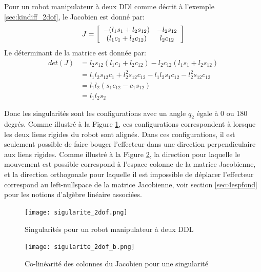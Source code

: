 \begin{example}

Pour un robot manipulateur à deux DDl comme décrit à l'exemple \ref{sec:kindiff_2dof}, le Jacobien est donné par:
\begin{align}
J = \left[ \begin{array}{c c} 
-(l_1 s_1 + l_2 s_{12}) & - l_2 s_{12} \\
 (l_1 c_1 + l_2 c_{12}) &   l_2 c_{12}
\end{array} \right]
\end{align} 
Le déterminant de la matrice est donnée par:
\begin{align}
det(J) &= l_2 s_{12} (l_1 c_1 + l_2 c_{12}) - l_2 c_{12} (l_1 s_1 + l_2 s_{12}) \\
       &= l_1 l_2 s_{12} c_1 + l_2^2 s_{12} c_{12} - l_1 l_2 s_1 c_{12} - l_2^2 s_{12} c_{12} \\
			 &= l_1 l_2 ( s_1 c_{12} - c_1 s_{12} ) \\
			 &= l_1 l_2 s_2
\end{align} 

Donc les singularités sont les configurations avec un angle $q_2$ égale à 0 ou 180 degrés. Comme illustré à la Figure \ref{fig:sigularite_2dof}, ces configurations correspondent à lorsque les deux liens rigides du robot sont alignés. Dans ces configurations, il est seulement possible de faire bouger l'effecteur dans une direction perpendiculaire aux liens rigides. Comme illustré à la Figure \ref{fig:sigularite_2dof_b}, la direction pour laquelle le mouvement est possible correspond à l'espace colonne de la matrice Jacobienne, et la direction orthogonale pour laquelle il est impossible de déplacer l'effecteur correspond au left-nullspace de la matrice Jacobienne, voir section \ref{sec:4espfond} pour les notions d'algèbre linéaire associées.

\begin{figure}[H]
	\centering
		\texttt{[image: sigularite\_2dof.png]}
	\caption{Singularités pour un robot manipulateur à deux DDL}
	\label{fig:sigularite_2dof}
\end{figure}

\begin{figure}[H]
	\centering
		\texttt{[image: sigularite\_2dof\_b.png]}
	\caption{Co-linéarité des colonnes du Jacobien pour une singularité}
	\label{fig:sigularite_2dof_b}
\end{figure}

\end{example}

